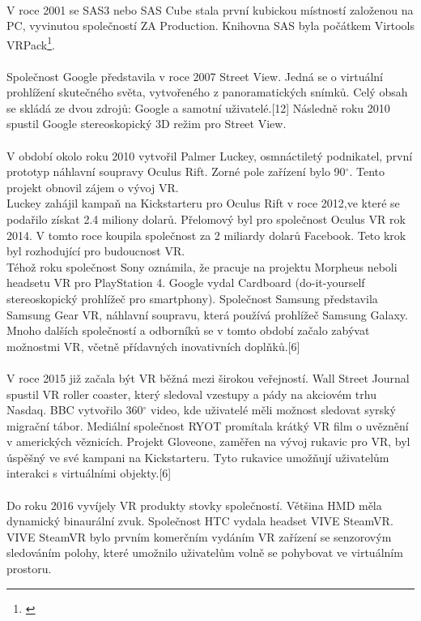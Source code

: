 \documentclass[a4paper, 12pt]{report}
\begin{document}
\\
V roce 2001 se SAS3 nebo SAS Cube stala první kubickou místností založenou na PC, vyvinutou společností ZA Production. Knihovna SAS byla počátkem Virtools VRPack\footnote{\textit{}}.\\
\\
Společnost Google představila v roce 2007 Street View. Jedná se o virtuální prohlížení skutečného světa, vytvořeného z panoramatických snímků. Celý obsah se skládá ze dvou zdrojů: Google a samotní uživatelé.[12] Následně roku 2010 spustil Google stereoskopický 3D režim pro Street View.\\
\\
V období okolo roku 2010 vytvořil Palmer Luckey, osmnáctiletý podnikatel, první prototyp náhlavní soupravy Oculus Rift. Zorné pole zařízení bylo 90$^\circ$. Tento projekt obnovil zájem o vývoj VR. \\
Luckey zahájil kampaň na Kickstarteru pro Oculus Rift v roce 2012,ve které se podařilo získat 2.4 miliony dolarů. Přelomový byl pro společnost Oculus VR rok 2014. V tomto roce koupila společnost za 2 miliardy dolarů Facebook. Teto krok byl rozhodující pro budoucnost VR. \\
Téhož roku společnost Sony oznámila, že pracuje na projektu Morpheus neboli headsetu VR pro PlayStation 4. Google vydal Cardboard (do-it-yourself stereoskopický prohlížeč pro smartphony). Společnost Samsung představila Samsung Gear VR, náhlavní soupravu, která používá prohlížeč Samsung Galaxy. Mnoho dalších společností a odborníků se v tomto období začalo zabývat možnostmi VR, včetně přídavných inovativních doplňků.[6]\\
\\
V roce 2015 již začala být VR běžná mezi širokou veřejností. Wall Street Journal spustil VR roller coaster, který sledoval vzestupy a pády na akciovém trhu Nasdaq. BBC vytvořilo 360$^\circ$ video, kde uživatelé měli možnost sledovat syrský migrační tábor. Mediální společnost RYOT promítala krátký VR film o uvěznění v amerických věznicích. Projekt Gloveone, zaměřen na vývoj rukavic pro VR, byl úspěšný ve své kampani na Kickstarteru. Tyto rukavice umožňují uživatelům interakci s virtuálními objekty.[6]\\
\\
Do roku 2016 vyvíjely VR produkty stovky společností. Většina HMD měla dynamický binaurální zvuk. Společnost HTC vydala headset VIVE SteamVR. VIVE SteamVR bylo prvním komerčním vydáním VR zařízení se senzorovým sledováním polohy, které umožnilo uživatelům volně se pohybovat ve virtuálním prostoru.
\end{document}
